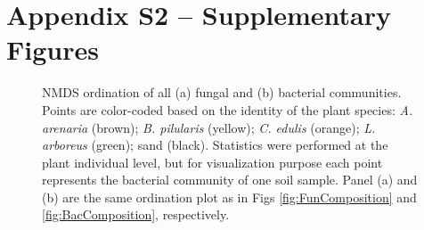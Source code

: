 \section{Appendix S2 -- Supplementary Figures}
\begin{figure}[h]
	\centering
	\caption[NMDS ordination of all (a) fungal and (b) bacterial communities.]
		{\hspace{1mm} 
		NMDS ordination of all (a) fungal and (b) bacterial communities. Points are color-coded based on the identity of the plant species: \textit{A. arenaria} (brown); \textit{B. pilularis} (yellow); \textit{C. edulis} (orange); \textit{L. arboreus} (green); sand (black). 
		Statistics were performed at the plant individual level, but for visualization purpose each point represents the bacterial community of one soil sample. Panel (a) and (b) are the same ordination plot as in Figs \ref{fig:FunComposition} and \ref{fig:BacComposition}, respectively.}
	\label{fig:BothComposition}
\end{figure}



